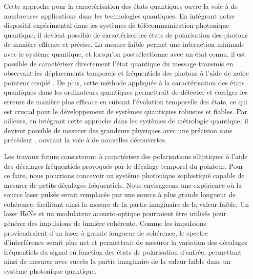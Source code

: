 \begin{onehalfspace}
    Cette approche pour la caractérisation des états
    quantiques ouvre la voie à de nombreuses applications dans les
    technologies quantiques. En intégrant notre dispositif expérimental
    dans les systèmes de télécommunication photonique quantique, il
    devient possible de caractériser les états de polarisation
    des photons de manière efficace et précise. 
    La mesure faible permet une interaction minimale avec le
    système quantique, et lorsqu’on postsélectionne avec un état connu,
    il est possible de caractériser directement l’état quantique du
    message transmis en observant les déplacements temporels et
    fréquentiels des photons à l’aide de notre pointeur couplé
    \cite{troupe2017quantumcryptographyweakmeasurements}. De plus,
    cette méthode appliquée à la caractérisation des états quantiques
    dans les ordinateurs quantiques permettrait de détecter et
    corriger les erreurs de manière plus efficace en suivant
    l’évolution temporelle des états, ce qui est crucial
    pour le développement de systèmes quantiques robustes et fiables.
    Par ailleurs, en intégrant cette approche dans les systèmes de
    métrologie quantique, il devient possible de mesurer des
    grandeurs physiques avec une précision sans précédent
    \cite{metrology,QuantumLimitedMetrology, RydbergDispersion}, ouvrant la
    voie à de nouvelles découvertes.

    \noindent Les travaux futurs consisteront à caractériser des
    polarisations elliptiques à l’aide des décalages fréquentiels
    provoqués par le décalage temporel du pointeur. Pour ce faire,
    nous pourrions concevoir un système photonique sophistiqué capable 
    de mesurer de petits décalages fréquentiels. Nous envisageons 
    une expérience où la source laser pulsée serait remplacée par
    une source à plus grande longueur de cohérence, facilitant ainsi
    la mesure de la partie imaginaire de la valeur faible. Un laser
    HeNe et un modulateur acousto-optique pourraient être utilisés pour
    générer des impulsions de lumière cohérente. Comme les impulsions
    proviendraient d’un laser à grande longueur de cohérence, le spectre
    d’interférence serait plus net et permettrait de mesurer
    la variation des décalages fréquentiels du signal en fonction
    des états de polarisation d’entrée, permettant ainsi de mesurer
    avec succès la partie imaginaire de la valeur faible
    dans un système photonique quantique.


\end{onehalfspace}
